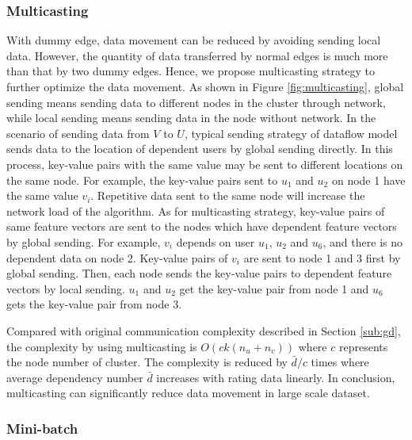 \documentclass{llncs}
\begin{document}
\subsubsection{Multicasting}
With dummy edge, data movement can be reduced by avoiding sending local data. However, the quantity of data transferred by normal edges is much more than that by two dummy edges. Hence, we propose multicasting strategy to further optimize the data movement. As shown in Figure \ref{fig:multicasting}, global sending means sending data to different nodes in the cluster through network, while local sending means sending data in the node without network. In the scenario of sending data from $V$ to $U$, typical sending strategy of dataflow model sends data to the location of dependent users by global sending directly. In this process, key-value pairs with the same value may be sent to different locations on the same node. For example, the key-value pairs sent to $u_1$ and $u_2$ on node 1 have the same value $v_i$. Repetitive data sent to the same node will increase the network load of the algorithm. As for multicasting strategy, key-value pairs of same feature vectors are sent to the nodes which have dependent feature vectors by global sending. For example, $v_i$ depends on user $u_1$, $u_2$ and $u_6$, and there is no dependent data on node 2. Key-value pairs of $v_i$ are sent to node 1 and 3 first by global sending. Then, each node sends the key-value pairs to dependent feature vectors by local sending. $u_1$ and $u_2$ get the key-value pair from node 1 and $u_6$ gets the key-value pair from node 3.

Compared with original communication complexity described in Section \ref{sub:gd}, the complexity by using multicasting is $O(ck(n_u + n_v))$ where $c$ represents the node number of cluster. The complexity is reduced by $\bar{d}/c$ times where average dependency number $\bar{d}$ increases with rating data linearly. In conclusion, multicasting can significantly reduce data movement in large scale dataset.
\vspace{-10pt}
\subsubsection{Mini-batch}
\end{document}
